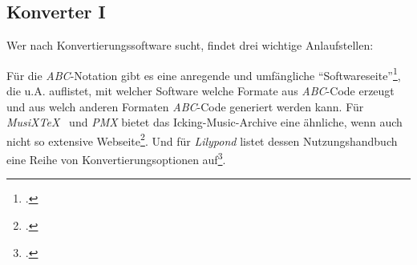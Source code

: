 %
%
%



\subsection{Konverter I}

Wer nach Konvertierungssoftware sucht, findet drei wichtige Anlaufstellen:

Für die \textit{ABC}-Notation gibt es eine anregende und umfängliche
\enquote{Softwareseite}\footcite[vgl.][\nopage wp]{Abc2018b}, die u.A.
auflistet, mit welcher Software welche Formate aus \textit{ABC}-Code erzeugt und
aus welch anderen Formaten \textit{ABC}-Code generiert werden kann. Für
\textit{MusiX\TeX\ } und \textit{PMX} bietet das Icking-Music-Archive eine ähnliche,
wenn auch nicht so extensive Webseite\footcite[vgl.][\nopage wp]{Tennent2018b}.
Und für \textit{Lilypond} listet dessen Nutzungshandbuch eine Reihe von
Konvertierungsoptionen auf\footcite[vgl.][42ff]{LilyPond2018e}.


